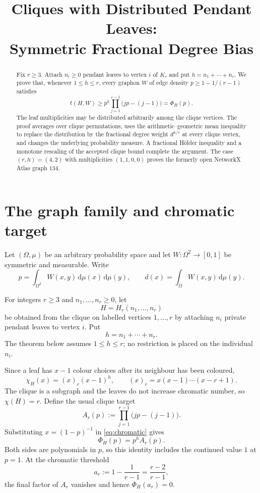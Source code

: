 \documentclass[11pt]{article}
\title{Cliques with Distributed Pendant Leaves:\\
Symmetric Fractional Degree Bias}
\author{}
\date{}
\newcommand{\dd}{\,\mathrm d}
\begin{document}
\maketitle

\begin{abstract}
Fix $r\geq3$.  Attach $n_i\geq0$ pendant leaves to vertex $i$ of $K_r$
and put $h=n_1+\cdots+n_r$.  We prove that, whenever $1\leq h\leq r$,
every graphon $W$ of edge density
$p\geq1-1/(r-1)$ satisfies
\[
 t(H,W)\geq p^h\prod_{j=1}^{r-1}\bigl(jp-(j-1)\bigr)
 =\Phi_H(p).
\]
The leaf multiplicities may be distributed arbitrarily among the clique
vertices.  The proof averages over clique permutations, uses the
arithmetic--geometric mean inequality to replace the distribution by the
fractional degree weight $d^{h/r}$ at every clique vertex, and changes the
underlying probability measure.  A fractional H\"older inequality and a
monotone rescaling of the accepted clique bound complete the argument.  The
case $(r,h)=(4,2)$ with multiplicities $(1,1,0,0)$ proves the formerly open
NetworkX Atlas graph $134$.
\end{abstract}


\section{The graph family and chromatic target}

Let $(\Omega,\mu)$ be an arbitrary probability space and let
$W\colon\Omega^2\to[0,1]$ be symmetric and measurable.  Write
\[
 p=\int_{\Omega^2}W(x,y)\dd\mu(x)\dd\mu(y),
 \qquad
 d(x)=\int_\Omega W(x,y)\dd\mu(y).
\]

For integers $r\geq3$ and $n_1,\ldots,n_r\geq0$, let
\[
 H=H_r(n_1,\ldots,n_r)
\]
be obtained from the clique on labelled vertices $1,\ldots,r$ by attaching
$n_i$ private pendant leaves to vertex $i$.  Put
\[
 h=n_1+\cdots+n_r.
\]
The theorem below assumes $1\leq h\leq r$; no restriction is placed on the
individual $n_i$.

Since a leaf has $x-1$ colour choices after its neighbour has been coloured,
\begin{equation}
 \chi_H(x)=(x)_r(x-1)^h,
 \qquad
 (x)_r=x(x-1)\cdots(x-r+1).
 \label{eq:chromatic}
\end{equation}
The clique is a subgraph and the leaves do not increase chromatic number, so
$\chi(H)=r$.  Define the usual clique target
\[
 A_r(p):=\prod_{j=1}^{r-1}\bigl(jp-(j-1)\bigr).
\]
Substituting $x=(1-p)^{-1}$ in \eqref{eq:chromatic} gives
\begin{equation}
 \Phi_H(p)=p^hA_r(p).
 \label{eq:target}
\end{equation}
Both sides are polynomials in $p$, so this identity includes the continued
value $1$ at $p=1$.  At the chromatic threshold
\[
 a_r:=1-\frac1{r-1}=\frac{r-2}{r-1},
\]
the final factor of $A_r$ vanishes and hence $\Phi_H(a_r)=0$.
\end{document}
